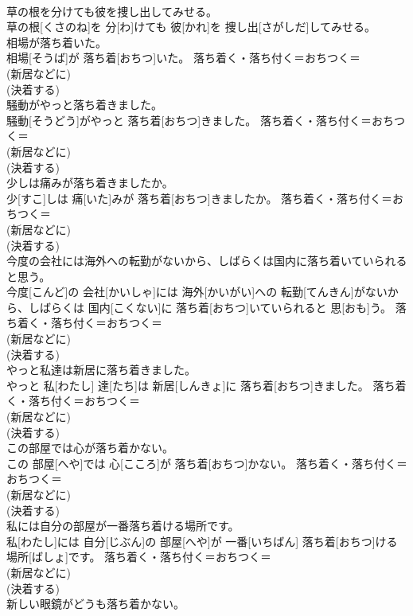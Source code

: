 \documentclass[8pt]{extreport}
\begin{document}
\begin{CJK}{UTF8}{min}
{\\	草の根を分けても彼を捜し出してみせる。	
\\	草の根[くさのね]を 分[わ]けても 彼[かれ]を 捜し出[さがしだ]してみせる。	
\\	相場が落ち着いた。	
\\	相場[そうば]が 落ち着[おちつ]いた。	落ち着く・落ち付く＝おちつく＝ 
\\	(新居などに) 
\\	(決着する) 
\\	騒動がやっと落ち着きました。	
\\	騒動[そうどう]がやっと 落ち着[おちつ]きました。	落ち着く・落ち付く＝おちつく＝ 
\\	(新居などに) 
\\	(決着する) 
\\	少しは痛みが落ち着きましたか。	
\\	少[すこ]しは 痛[いた]みが 落ち着[おちつ]きましたか。	落ち着く・落ち付く＝おちつく＝ 
\\	(新居などに) 
\\	(決着する) 
\\	今度の会社には海外への転勤がないから、しばらくは国内に落ち着いていられると思う。	
\\	今度[こんど]の 会社[かいしゃ]には 海外[かいがい]への 転勤[てんきん]がないから、しばらくは 国内[こくない]に 落ち着[おちつ]いていられると 思[おも]う。	落ち着く・落ち付く＝おちつく＝ 
\\	(新居などに) 
\\	(決着する) 
\\	やっと私達は新居に落ち着きました。	
\\	やっと 私[わたし] 達[たち]は 新居[しんきょ]に 落ち着[おちつ]きました。	落ち着く・落ち付く＝おちつく＝ 
\\	(新居などに) 
\\	(決着する) 
\\	この部屋では心が落ち着かない。	
\\	この 部屋[へや]では 心[こころ]が 落ち着[おちつ]かない。	落ち着く・落ち付く＝おちつく＝ 
\\	(新居などに) 
\\	(決着する) 
\\	私には自分の部屋が一番落ち着ける場所です。	
\\	私[わたし]には 自分[じぶん]の 部屋[へや]が 一番[いちばん] 落ち着[おちつ]ける 場所[ばしょ]です。	落ち着く・落ち付く＝おちつく＝ 
\\	(新居などに) 
\\	(決着する) 
\\	新しい眼鏡がどうも落ち着かない。	
}
\end{CJK}
\end{document}
